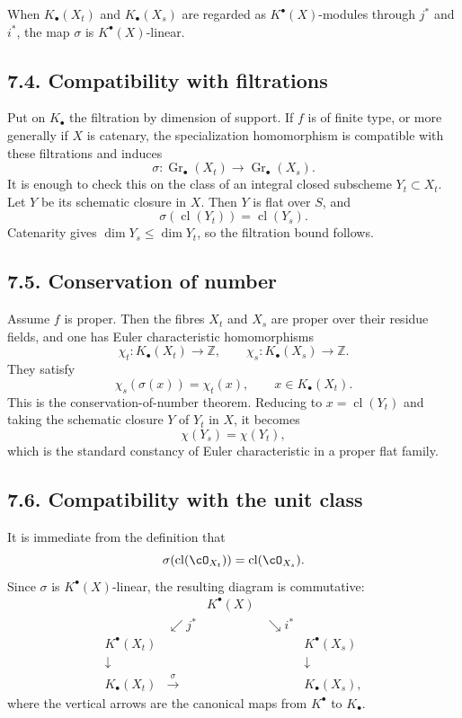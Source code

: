 \documentclass[11pt]{article}
\theoremstyle{plain}
\theoremstyle{definition}
\theoremstyle{remark}
\newcommand{\ZZ}{\mathbb Z}
\DeclareMathOperator{\Gr}{Gr}
\DeclareMathOperator{\cl}{cl}
\newcommand{\longto}{\longrightarrow}
\providecommand{\xto}[1]{\xrightarrow{#1}}
\begin{document}
When $K_\bullet(X_t)$ and $K_\bullet(X_s)$ are regarded as $K^\bullet(X)$-modules through $j^*$ and $i^*$, the map $\sigma$ is $K^\bullet(X)$-linear.

\subsection*{7.4. Compatibility with filtrations}

Put on $K_\bullet$ the filtration by dimension of support. If $f$ is of finite type, or more generally if $X$ is catenary, the specialization homomorphism is compatible with these filtrations and induces
\[
\sigma:\Gr_\bullet(X_t)\longto\Gr_\bullet(X_s).
\]
It is enough to check this on the class of an integral closed subscheme $Y_t\subset X_t$. Let $Y$ be its schematic closure in $X$. Then $Y$ is flat over $S$, and
\[
\sigma(\cl(Y_t))=\cl(Y_s).
\]
Catenarity gives $\dim Y_s\leq\dim Y_t$, so the filtration bound follows.

\subsection*{7.5. Conservation of number}

Assume $f$ is proper. Then the fibres $X_t$ and $X_s$ are proper over their residue fields, and one has Euler characteristic homomorphisms
\[
\chi_t:K_\bullet(X_t)\longto\ZZ,
\qquad
\chi_s:K_\bullet(X_s)\longto\ZZ.
\]
They satisfy
\[
\chi_s(\sigma(x))=\chi_t(x),\qquad x\in K_\bullet(X_t).
\]
This is the conservation-of-number theorem. Reducing to $x=\cl(Y_t)$ and taking the schematic closure $Y$ of $Y_t$ in $X$, it becomes
\[
\chi(Y_s)=\chi(Y_t),
\]
which is the standard constancy of Euler characteristic in a proper flat family.

\subsection*{7.6. Compatibility with the unit class}

It is immediate from the definition that
\[
\sigma(\cl(\cO_{X_t}))=\cl(\cO_{X_s}).
\]
Since $\sigma$ is $K^\bullet(X)$-linear, the resulting diagram is commutative:
\[
\begin{array}{ccccc}
&&K^\bullet(X)&&\\
&\swarrow\scriptstyle j^*&&\searrow\scriptstyle i^* &\\
K^\bullet(X_t)&&&&K^\bullet(X_s)\\
\downarrow&&&&\downarrow\\
K_\bullet(X_t)&\xto{\,\sigma\,}&&&K_\bullet(X_s),
\end{array}
\]
where the vertical arrows are the canonical maps from $K^\bullet$ to $K_\bullet$.
\end{document}

